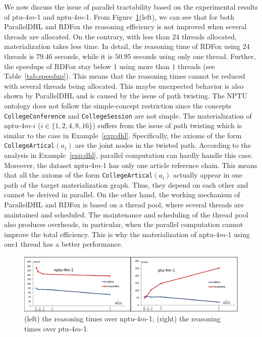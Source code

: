 We now discuss the issue of parallel tractability based on the experimental
results of ptu-$4m$-1 and nptu-$4m$-1.
From Figure~\ref{fig:diffthreads}(left),
we can see that for both ParallelDHL and RDFox the reasoning efficiency is not
improved when several threads are allocated. On the contrary, with less than 24 threads allocated,
materialization takes less time. In detail,
the reasoning time of RDFox using $24$ threads
is $79.46$ seconds, while it is $50.95$ seconds using only one thread.
Further, the speedups of RDFox stay below $1$ using more than $1$ threads (see Table~\ref{tab:speedup}).
This means that the reasoning times cannot be reduced with several threads being
allocated.
This maybe unexpected behavior is also shown by ParallelDHL and is caused by the issue of path twisting.
The NPTU ontology does not follow the simple-concept restriction since
the concepts \texttt{CollegeConference} and \texttt{CollegeSession} are not simple.
The materialization of nptu-$4m$-$i$ ($i\in\{1,2,4,8,16\}$) suffers from the issue
of path twisting which is similar to the case in Example~\ref{exp:dhl}.
Specifically, the axioms of the form \texttt{CollegeArtical}$(a_i)$ are
the joint nodes in the twisted path.
According to the analysis in Example~\ref{exp:dhl}, parallel computation can hardly
handle this case. Moreover, the dataset nptu-$4m$-1 has only one
article reference chain. This means that all
the axioms of the form \texttt{CollegeArtical}$(a_i)$ actually
appear in one path of the target materialization graph.
Thus, they depend on each other and cannot be derived in parallel.
On the other hand, the working mechanism of ParallelDHL and RDFox is based on
a thread pool, where several threads are maintained and scheduled.
The maintenance and scheduling of the thread pool also produces
overheads, in particular, when the parallel computation
cannot improve the total efficiency.
This is why the materialization of nptu-$4m$-1 using one$1$
thread has a better performance.

\begin{figure}[htbp]
\begin{center}
\includegraphics[width=1\textwidth]{fig-diff-threads.eps}
\caption{(left) the reasoning times over nptu-$4m$-1; (right) the reasoning times over ptu-$4m$-1.}
\label{fig:diffthreads}
\end{center}
\end{figure}

